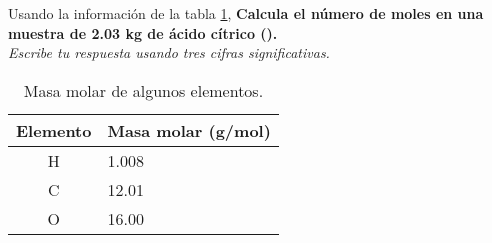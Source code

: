 Usando la información de la tabla \ref{tab:q003},
\textbf{Calcula el número de moles en una muestra de 2.03 kg de ácido cítrico ().}\\
\emph{Escribe tu respuesta usando tres cifras significativas.}

\begin{multicols}{2}

    \begin{table}[H]
        \centering
        \caption{Masa molar de algunos elementos.}
        \label{tab:q003}
        \begin{tabular}{c|p{2.2cm}}
            \textbf{Elemento} & \textbf{Masa molar (g/mol)} \\\midrule
            H                 & 1.008                       \\\hline
            C                 & 12.01                       \\\hline
            O                 & 16.00                       \\\hline
            \bottomrule
        \end{tabular}
    \end{table}

    \columnbreak

    \begin{solutionbox}{7cm}
    \end{solutionbox}
\end{multicols}